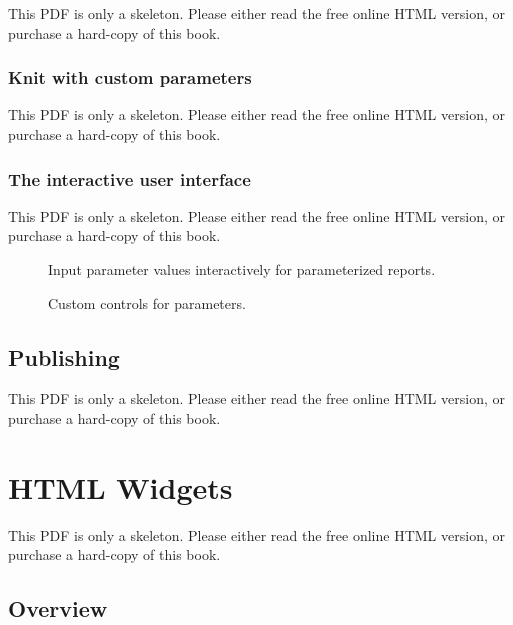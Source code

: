 \documentclass[
  11pt,
]{krantz}
\theoremstyle{definition}
\theoremstyle{definition}
\theoremstyle{definition}
\theoremstyle{definition}
\theoremstyle{remark}
\begin{document}
This PDF is only a skeleton. Please either read the free online HTML version, or purchase a hard-copy of this book.

\subsection{Knit with custom parameters}\label{knit-with-custom-parameters}

This PDF is only a skeleton. Please either read the free online HTML version, or purchase a hard-copy of this book.

\subsection{The interactive user interface}\label{the-interactive-user-interface}

This PDF is only a skeleton. Please either read the free online HTML version, or purchase a hard-copy of this book.

\begin{figure}\caption{Input parameter values interactively for parameterized reports.}\end{figure}

\begin{figure}\caption{Custom controls for parameters.}\end{figure}

\begin{table}\caption{\label{tab:params-types}Possible input types and the associated Shiny functions for parameterized reports.}\end{table}

\section{Publishing}\label{params-publish}

This PDF is only a skeleton. Please either read the free online HTML version, or purchase a hard-copy of this book.

\chapter{HTML Widgets}\label{html-widgets}

This PDF is only a skeleton. Please either read the free online HTML version, or purchase a hard-copy of this book.

\section{Overview}\label{htmlwidgets-overview}
\end{document}
